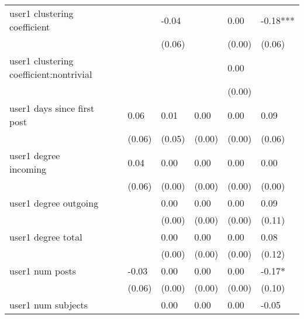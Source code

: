 \begin{table*}
\begin{center}
\begin{tabular}{llllllll}
user1 clustering coefficient                   &          &            &         & -0.04   &          & 0.00               & -0.18***  \\
                                               &          &            &         & (0.06)  &          & (0.00)             & (0.06)    \\
user1 clustering coefficient:nontrivial        &          &            &         &         &          & 0.00               &           \\
                                               &          &            &         &         &          & (0.00)             &           \\
user1 days since first post                    &          &            & 0.06    & 0.01    & 0.00     & 0.00               & 0.09      \\
                                               &          &            & (0.06)  & (0.05)  & (0.00)   & (0.00)             & (0.06)    \\
user1 degree incoming                          &          &            & 0.04    & 0.00    & 0.00     & 0.00               & 0.00      \\
                                               &          &            & (0.06)  & (0.00)  & (0.00)   & (0.00)             & (0.00)    \\
user1 degree outgoing                          &          &            &         & 0.00    & 0.00     & 0.00               & 0.09      \\
                                               &          &            &         & (0.00)  & (0.00)   & (0.00)             & (0.11)    \\
user1 degree total                             &          &            &         & 0.00    & 0.00     & 0.00               & 0.08      \\
                                               &          &            &         & (0.00)  & (0.00)   & (0.00)             & (0.12)    \\
user1 num posts                                &          &            & -0.03   & 0.00    & 0.00     & 0.00               & -0.17*    \\
                                               &          &            & (0.06)  & (0.00)  & (0.00)   & (0.00)             & (0.10)    \\
user1 num subjects                             &          &            &         & 0.00    & 0.00     & 0.00               & -0.05     \\

\end{tabular}
\end{center}
\end{table*}
